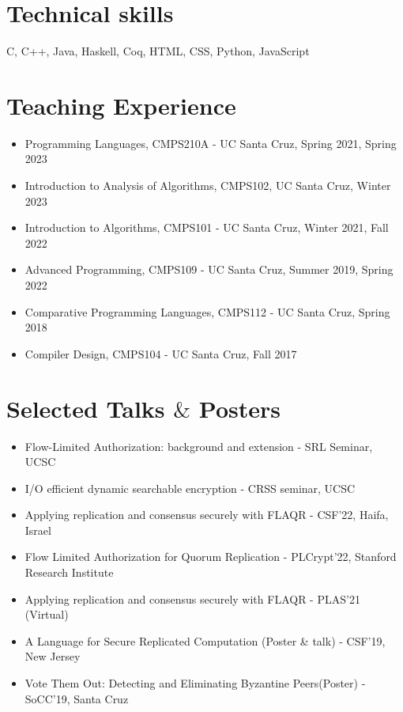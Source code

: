 \documentclass[9pt,a4paper]{moderncv}
\begin{document}
\section{Technical skills}
\hspace{-0.1cm} {C, C++, Java, Haskell, Coq, HTML, CSS, Python, JavaScript}
\hspace{-0.1cm}
\section{Teaching Experience}
\begin{itemize}
\item Programming Languages, CMPS210A - UC Santa Cruz, Spring 2021, Spring 2023 
\item Introduction to Analysis of Algorithms, CMPS102, UC Santa Cruz, Winter 2023
\item Introduction to Algorithms, CMPS101 - UC Santa Cruz, Winter 2021, Fall 2022
\item Advanced Programming, CMPS109 - UC Santa Cruz, Summer 2019, Spring 2022
\item Comparative Programming Languages, CMPS112 - UC Santa Cruz, Spring 2018
\item Compiler Design, CMPS104 - UC Santa Cruz, Fall 2017
\end{itemize}
\section{Selected Talks $\&$ Posters}
\begin{itemize}
\item Flow-Limited Authorization: background and extension - SRL Seminar, UCSC
\item I/O efficient dynamic searchable encryption - CRSS seminar, UCSC
\item Applying replication and consensus securely with FLAQR - CSF'22, Haifa, Israel
\item Flow Limited Authorization for Quorum Replication - PLCrypt'22, Stanford Research Institute
\item Applying replication and consensus securely with FLAQR - PLAS'21 (Virtual)%
\item A Language for Secure Replicated Computation (Poster \& talk) - CSF'19, New Jersey
\item Vote Them Out: Detecting and Eliminating Byzantine Peers(Poster) - SoCC'19, Santa Cruz 
\end{itemize}
\end{document}
